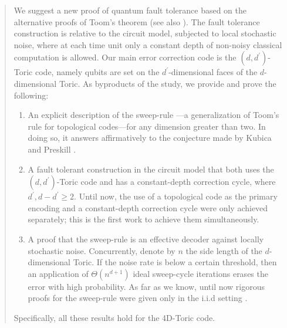 \begin{abstract}
We suggest a new proof of quantum fault tolerance based on the alternative proofs of Toom's theorem \cite{Berman} (see also \cite{gacs2021newversiontoomsproof}). The fault tolerance construction is relative to the circuit model, subjected to local stochastic noise, where at each time unit only a constant depth of non-noisy classical computation is allowed. Our main error correction code is the $(d,d^{\prime})$-Toric code, namely qubits are set on the $d^{\prime}$-dimensional faces of the $d$-dimensional Toric. As byproducts of the study, we provide and prove the following:
  \begin{enumerate}
    \item  An explicit description of the sweep-rule —a generalization of Toom's rule for topological codes—for any dimension greater than two. In doing so, it answers affirmatively to the conjecture made by Kubica and Preskill \cite{Kubica_2019}.
    \item A fault tolerant construction in the circuit model that both uses the $(d,d^{\prime})$-Toric code and has a constant-depth correction cycle, where $d^{\prime}, d - d^{\prime} \ge 2$. Until now, the use of a topological code as the primary encoding and a constant-depth correction cycle were only achieved separately; this is the first work to achieve them simultaneously.
   
    \item A proof that the sweep-rule is an effective decoder against locally stochastic noise. Concurrently, denote by $n$ the side length of the $d$-dimensional Toric. If the noise rate is below a certain threshold, then an application of $\Theta(n^{d +1})$ ideal sweep-cycle iterations erases the error with high probability. As far as we know, until now rigorous proofs for the sweep-rule were given only in the i.i.d setting \cite{Kubica_2019}. 

  \end{enumerate}
Specifically, all these results hold for the 4D-Toric code.
\end{abstract}

